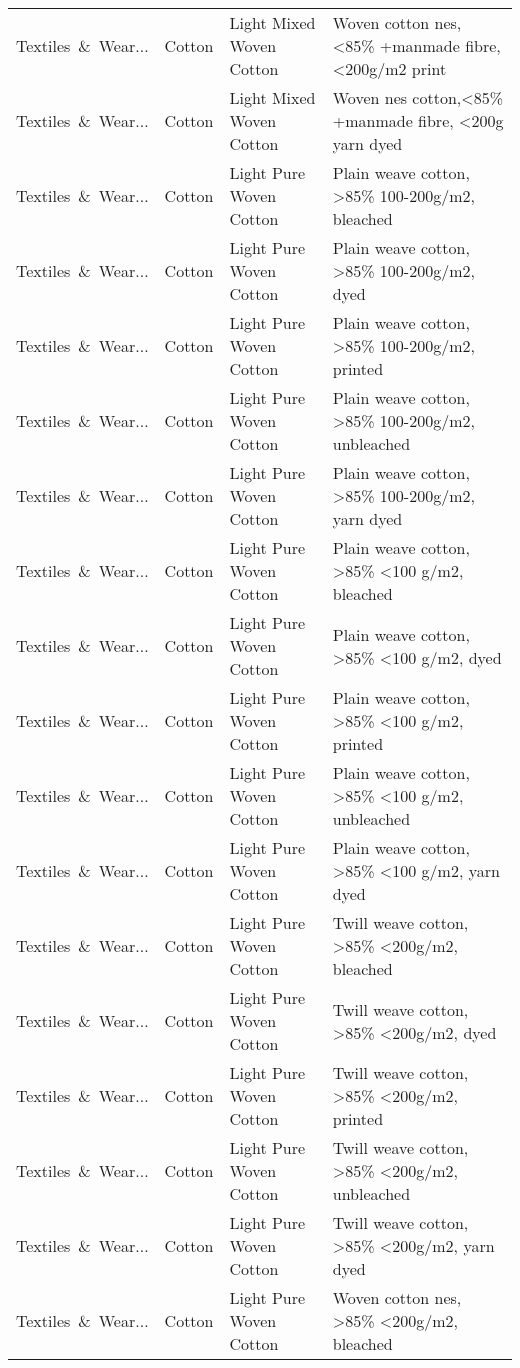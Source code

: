 \begin{appendices}
\begin{xltabular}{\textwidth}{|p{0.10\textwidth}|p{0.25\textwidth}|p{0.24\textwidth}|p{0.31\textwidth}|}
Textiles\ \&\ Wear... & Cotton & Light Mixed Woven Cotton & Woven cotton nes, <85\% +manmade fibre, <200g/m2 print \\
Textiles\ \&\ Wear... & Cotton & Light Mixed Woven Cotton & Woven nes cotton,<85\% +manmade fibre, <200g yarn dyed \\
Textiles\ \&\ Wear... & Cotton & Light Pure Woven Cotton & Plain weave cotton, >85\% 100-200g/m2, bleached \\
Textiles\ \&\ Wear... & Cotton & Light Pure Woven Cotton & Plain weave cotton, >85\% 100-200g/m2, dyed \\
Textiles\ \&\ Wear... & Cotton & Light Pure Woven Cotton & Plain weave cotton, >85\% 100-200g/m2, printed \\
Textiles\ \&\ Wear... & Cotton & Light Pure Woven Cotton & Plain weave cotton, >85\% 100-200g/m2, unbleached \\
Textiles\ \&\ Wear... & Cotton & Light Pure Woven Cotton & Plain weave cotton, >85\% 100-200g/m2, yarn dyed \\
Textiles\ \&\ Wear... & Cotton & Light Pure Woven Cotton & Plain weave cotton, >85\% <100 g/m2, bleached \\
Textiles\ \&\ Wear... & Cotton & Light Pure Woven Cotton & Plain weave cotton, >85\% <100 g/m2, dyed \\
Textiles\ \&\ Wear... & Cotton & Light Pure Woven Cotton & Plain weave cotton, >85\% <100 g/m2, printed \\
Textiles\ \&\ Wear... & Cotton & Light Pure Woven Cotton & Plain weave cotton, >85\% <100 g/m2, unbleached \\
Textiles\ \&\ Wear... & Cotton & Light Pure Woven Cotton & Plain weave cotton, >85\% <100 g/m2, yarn dyed \\
Textiles\ \&\ Wear... & Cotton & Light Pure Woven Cotton & Twill weave cotton, >85\% <200g/m2, bleached \\
Textiles\ \&\ Wear... & Cotton & Light Pure Woven Cotton & Twill weave cotton, >85\% <200g/m2, dyed \\
Textiles\ \&\ Wear... & Cotton & Light Pure Woven Cotton & Twill weave cotton, >85\% <200g/m2, printed \\
Textiles\ \&\ Wear... & Cotton & Light Pure Woven Cotton & Twill weave cotton, >85\% <200g/m2, unbleached \\
Textiles\ \&\ Wear... & Cotton & Light Pure Woven Cotton & Twill weave cotton, >85\% <200g/m2, yarn dyed \\
Textiles\ \&\ Wear... & Cotton & Light Pure Woven Cotton & Woven cotton nes, >85\% <200g/m2, bleached \\

\end{xltabular}
\end{appendices}
